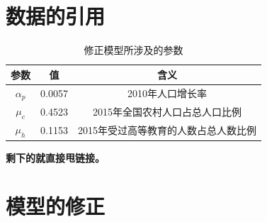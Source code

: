 \documentclass[a4paper]{article}
\begin{document}
\section{数据的引用}
	\begin{table}[H]
		\centering
		\caption{修正模型所涉及的参数}
		\label{amend_data}
		\begin{tabular}{ccc}
			\hline
			参数				&	值			&	含义 \\
			\hline
			$\alpha_p$	&	0.0057	& 2010年人口增长率	\\
			$\mu_c$			&	0.4523	&	2015年全国农村人口占总人口比例	\\
			$\mu_h$		&	0.1153	&	2015年受过高等教育的人数占总人数比例	\\
			\hline
		\end{tabular}
	\end{table}
\textbf{剩下的就直接甩链接。}
\section{模型的修正}
\end{document}
